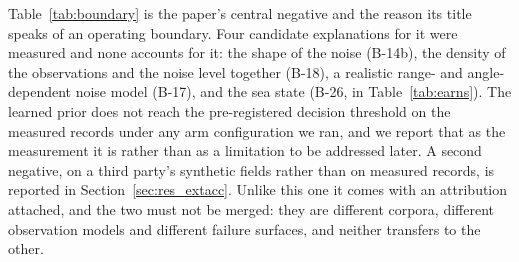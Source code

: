 \documentclass[review]{elsarticle}
\begin{document}
Table~\ref{tab:boundary} is the paper's central negative and the reason its title
speaks of an operating boundary. Four candidate explanations for it were measured
and none accounts for it: the shape of the noise (B-14b), the density of the
observations and the noise level together (B-18), a realistic range- and
angle-dependent noise model (B-17), and the sea state (B-26, in
Table~\ref{tab:earns}). The learned prior does not reach the pre-registered
decision threshold on the measured records under any arm configuration we ran, and
we report that as the measurement it is rather than as a limitation to be
addressed later.
A second negative, on a third party's synthetic fields rather than on measured
records, is reported in Section~\ref{sec:res_extacc}. Unlike this one it comes with
an attribution attached, and the two must not be merged: they are different corpora,
different observation models and different failure surfaces, and neither transfers to
the other.
\end{document}
